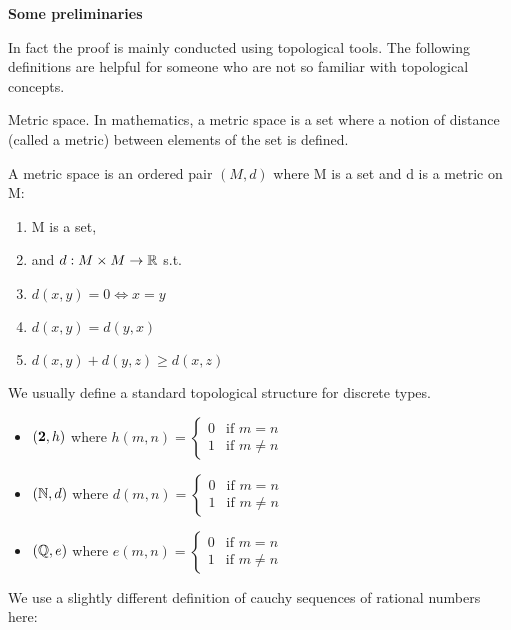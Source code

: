 \textbf{Some preliminaries}

In fact the proof is mainly conducted using topological tools. The
following definitions are helpful for someone who are not so familiar
with topological concepts.


\begin{definition}
Metric space. In mathematics, a metric space is a set where a notion
of distance (called a metric) between elements of the set is defined.

A metric space is an ordered pair $(M , d)$ where M is a set and d is a metric on M:
\begin{enumerate}
\item M is a set,
\item and $d : M \times M \rightarrow \mathbb{R}$ s.t.
\item $d (x , y) = 0 \iff x = y$
\item $d(x,y)=d(y,x)$
\item $d(x,y)+d(y,z) \ge d(x,z)$ 
\end{enumerate}
\end{definition}

We usually define a standard topological structure for discrete types.

\begin{itemize}

\item $(\mathbf{2} , h)$ where 
$h(m,n) =
\left\{
	\begin{array}{ll}
		0  & \mbox{if } m = n \\
		1 & \mbox{if } m \neq n
	\end{array}
\right.
$

\item $(\mathbb{N} , d)$ where 
$d(m,n) =
\left\{
	\begin{array}{ll}
		0  & \mbox{if } m = n \\
		1 & \mbox{if } m \neq n
	\end{array}
\right.
$

\item $(\mathbb{Q} , e)$ where 
$e(m,n) =
\left\{
	\begin{array}{ll}
		0  & \mbox{if } m = n \\
		1 & \mbox{if } m \neq n
	\end{array}
\right.
$

\end{itemize}

We use a slightly different definition of cauchy sequences of rational
numbers here:

